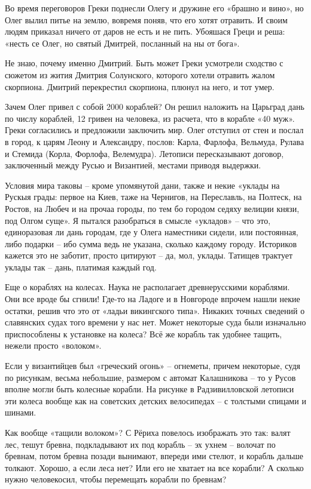 Во время переговоров Греки поднесли Олегу и дружине его «брашно и вино», но Олег вылил питье на землю, вовремя поняв, что его хотят отравить. И своим людям приказал ничего от даров не есть и не пить. Убояшася Греци и реша: «несть се Олег, но святый Дмитрей, посланный на ны от бога». 

Не знаю, почему именно Дмитрий. Быть может Греки усмотрели сходство с сюжетом из жития Дмитрия Солунского, которого хотели отравить жалом скорпиона. Дмитрий перекрестил скорпиона, плюнул на него, и тот умер.

Зачем Олег привел с собой 2000 кораблей? Он решил наложить на Царьград дань по числу кораблей, 12 гривен на человека, из расчета, что в корабле «40 муж». Греки согласились и предложили заключить мир. Олег отступил от стен и послал в город, к царям Леону и Александру, послов: Карла, Фарлофа, Вельмуда, Рулава и Стемида (Корла, Форлофа, Велемудра). Летописи пересказывают договор, заключенный между Русью и Византией, местами приводя выдержки.

Условия мира таковы – кроме упомянутой дани, также и некие «уклады на Рускыя грады: первое на Киев, таже на Чернигов, на Переславль, на Полтеск, на Ростов, на Любеч и на прочаа городы, по тем бо городом седяху велиции князи, под Олгом суще». Я пытался разобраться в смысле «укладов» – что это, единоразовая ли дань городам, где у Олега наместники сидели, или постоянная, либо подарки – ибо сумма ведь не указана, сколько каждому городу. Историков кажется это не заботит, просто цитируют – да, мол, уклады. Татищев трактует уклады так – дань, платимая каждый год.

Еще о кораблях на колесах. Наука не располагает древнерусскими кораблями. Они все вроде бы сгнили! Где-то на Ладоге и в Новгороде впрочем нашли некие остатки, решив что это от «ладьи викингского типа». Никаких точных сведений о славянских судах того времени у нас нет. Может некоторые суда были изначально приспособлены к установке на колеса? Всё же корабль так удобнее тащить, нежели просто «волоком». 

Если у византийцев был «греческий огонь» – огнеметы, причем некоторые, судя по рисункам, весьма небольшие, размером с автомат Калашникова – то у Русов вполне могли быть колесные корабли. На рисунке в Радзивилловской летописи эти колеса вообще как на советских детских велосипедах – с толстыми спицами и шинами. 

Как вообще «тащили волоком»? С Рёриха повелось изображать это так: валят лес, тешут бревна, подкладывают их под корабль – эх ухнем – волочат по бревнам, потом бревна позади вынимают, впереди ими стелют, и корабль дальше толкают. Хорошо, а если леса нет? Или его не хватает на все корабли? А сколько нужно человекосил, чтобы перемещать корабли по бревнам?

